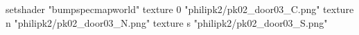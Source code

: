 setshader "bumpspecmapworld"
    texture 0 "philipk2/pk02_door03_C.png"
    texture n "philipk2/pk02_door03_N.png"
    texture s "philipk2/pk02_door03_S.png"